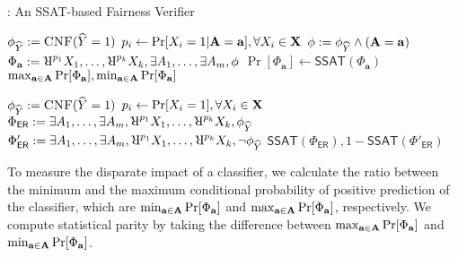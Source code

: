 \begin{algorithm}[t!]
	\caption{\justicia: An SSAT-based Fairness Verifier}
	\label{fairness_justicia_algo:enum}
	\begin{algorithmic}[1]
		\label{fairness_justicia_algo:justicia_enum_begin}
		\State $ \phi_{\widehat{Y}} := \textsc{CNF}(\widehat{Y} = 1) $
		\State $ p_{i} \leftarrow \Pr[X_i = 1|\mathbf{A} = \mathbf{a}], \forall X_i \in \mathbf{X} $
		\State $ \phi := \phi_{\widehat{Y}} \wedge (\mathbf{A} =\mathbf{a}) $
		\State $  \Phi_\mathbf{a} := \R^{p_{1}}X_1, \dots, \R^{p_{\numnonsensitive}}X_{\numnonsensitive}, \exists A_1,\dots, \exists A_{\numsensitive},  \phi $
		\State $ \Pr[\Phi_\mathbf{a}]  \leftarrow \mathsf{SSAT}(\Phi_\mathbf{a}) $ 
		\EndFor
		\State\Return $ \max_{\mathbf{a} \in \mathbf{A}} \Pr[\Phi_{\mathbf{a}}], \min_{\mathbf{a} \in \mathbf{A}} \Pr[\Phi_{\mathbf{a}}] $
		\label{fairness_justicia_algo:justicia_enum_end}
		\EndFunction
		\Statex
		
		
		
		\label{fairness_justicia_algo:justicia_learn_begin}
		\State $ \phi_{\widehat{Y}} := \textsc{CNF}(\widehat{Y}  = 1) $
		\State $ p_{i} \leftarrow \Pr[X_i=1], \forall X_i \in \mathbf{X} $
		\State $  \Phi_\mathsf{ER} := \exists A_1,\dots, \exists A_{\numsensitive}, \R^{p_{1}}X_1, \dots, \R^{p_{\numnonsensitive}}X_{\numnonsensitive}, \phi_{\widehat{Y}} $
		\State $  \Phi'_\mathsf{ER} := \exists A_1,\dots, \exists A_{\numsensitive}, \R^{p_{1}}X_1, \dots, \R^{p_{\numnonsensitive}}X_{\numnonsensitive}, \neg \phi_{\widehat{Y}} $
		\State\Return $ \mathsf{SSAT}(\Phi_\mathsf{ER}), 1 - \mathsf{SSAT}(\Phi'_\mathsf{ER}) $
		\label{fairness_justicia_algo:justicia_learn_end}
		\EndFunction
	\end{algorithmic}

\end{algorithm}


To measure the disparate impact of a classifier, we calculate the ratio between the minimum and the maximum conditional probability of positive prediction of the classifier, which are  $ \min_{\mathbf{a} \in \mathbf{A}} \Pr[\Phi_{\mathbf{a}}] $ and $ \max_{\mathbf{a} \in \mathbf{A}} \Pr[\Phi_{\mathbf{a}}] $, respectively. We compute statistical parity by taking the difference between $ \max_{\mathbf{a} \in \mathbf{A}} \Pr[\Phi_{\mathbf{a}}] $ and $ \min_{\mathbf{a} \in \mathbf{A}} \Pr[\Phi_{\mathbf{a}}] $. 


